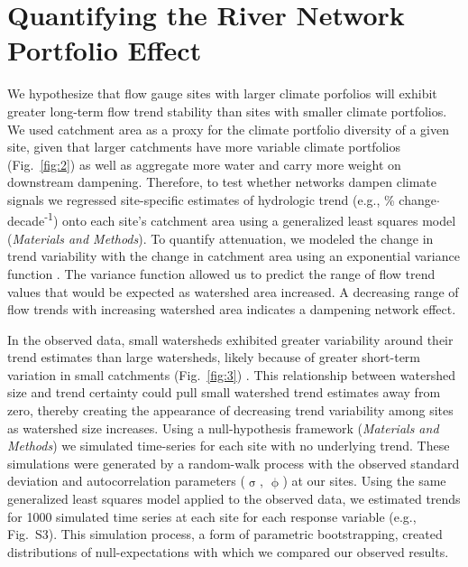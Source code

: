 \documentclass[9pt,twocolumn,twoside,lineno]{pnas-new}
\begin{document}
\section*{Quantifying the River Network Portfolio Effect}
We hypothesize that flow gauge sites with larger climate porfolios will exhibit greater long-term flow trend stability than sites with smaller climate portfolios. We used catchment area as a proxy for the climate portfolio diversity of a given site, given that larger catchments have more variable climate portfolios (Fig.~\ref{fig:2}) as well as aggregate more water and carry more weight on downstream dampening. Therefore, to test whether networks dampen climate signals we regressed site-specific estimates of hydrologic trend (e.g., \% change$\cdot$decade\textsuperscript{-1}) onto each site's catchment area using a generalized least squares model (\textit{Materials and Methods}). To quantify attenuation, we modeled the change in trend variability with the change in catchment area using an exponential variance function \cite{Pinheiro:2000}. The variance function allowed us to predict the range of flow trend values that would be expected as watershed area increased. A decreasing range of flow trends with increasing watershed area indicates a dampening network effect.

In the observed data, small watersheds exhibited greater variability around their trend estimates than large watersheds, likely because of greater short-term variation in small catchments (Fig.~\ref{fig:3}) \cite{Moore:2015}. This relationship between watershed size and trend certainty could pull small watershed trend estimates away from zero, thereby creating the appearance of decreasing trend variability among sites as watershed size increases. Using a null-hypothesis framework (\textit{Materials and Methods}) we simulated time-series for each site with no underlying trend. These simulations were generated by a random-walk process with the observed standard deviation and autocorrelation parameters ($\hat{\upsigma}$, $\hat{\upphi}$) at our sites. Using the same generalized least squares model applied to the observed data, we estimated trends for 1000 simulated time series at each site for each response variable (e.g., Fig.~S3). This simulation process, a form of parametric bootstrapping, created distributions of null-expectations with which we compared our observed results.
\end{document}
